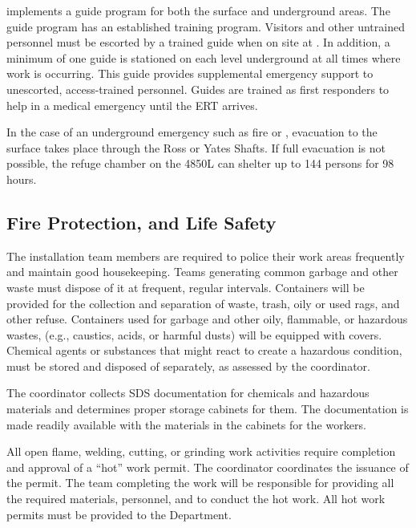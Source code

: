  implements a guide program for both the surface and
underground areas. The guide program has an established training
program.  Visitors and other untrained personnel must be escorted by a trained
guide when on site at . %
In addition, a minimum of one guide is stationed on each %
level underground at all times where work is occurring. This guide provides
supplemental emergency support to unescorted, access-trained
personnel. Guides are trained as first responders to help in a medical
emergency until the ERT arrives.

In the case of an underground emergency such as fire or ,
evacuation to the surface takes place through the Ross or Yates Shafts.
If full evacuation is not  possible, the refuge chamber on the 4850L
 can shelter up to 144 persons for 98 hours.

\subsection{Fire Protection,  and Life Safety}

The  installation team members are required to police their work areas
frequently and maintain good housekeeping. Teams generating common garbage and other
waste must dispose of it at frequent, regular intervals. %
Containers will be provided for the
collection and separation of waste, trash, oily or used rags, and other
refuse.  Containers used for garbage and other oily, flammable, or
hazardous wastes, (e.g., caustics, acids, or harmful dusts) will be equipped with covers.  Chemical agents or
substances that might react to create a hazardous condition, must
be stored and disposed of separately, as assessed by the
  coordinator.

The   coordinator collects SDS documentation for chemicals and hazardous materials and determines proper storage cabinets for them.  The documentation is made readily available with the materials in the cabinets for the workers. 



All open flame, welding, cutting, or grinding work activities require completion and approval of a  ``hot'' work permit.  The 
 coordinator coordinates the issuance of the permit.
The team completing the work will be responsible for
providing all the required materials, personnel, and  %
to conduct the hot work. All hot work permits must be
provided to the   Department.

